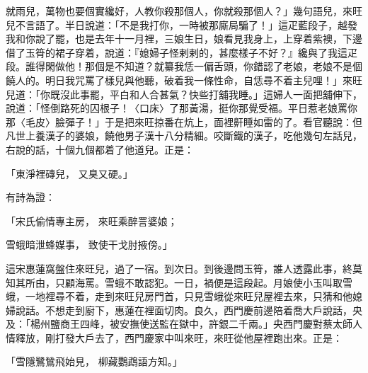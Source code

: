 \begin{showcontents}{}
就雨兒，萬物也要個實纔好，人教你殺那個人，你就殺那個人？」幾句語兒，來旺兒不言語了。半日說道：「不是我打你，一時被那廝局騙了！」這疋藍段子，越發我和你說了罷，也是去年十一月裡，三娘生日，娘看見我身上，上穿着紫襖，下邊借了玉筲的裙子穿着，說道：『媳婦子怪剌剌的，甚麼樣子不好？』纔與了我這疋段。誰得閑做他！那個是不知道？就纂我恁一偏舌頭，你錯認了老娘，老娘不是個饒人的。明日我咒罵了樣兒與他聽，破着我一條性命，自恁尋不着主兒哩！」來旺兒道：「你既沒此事罷，平白和人合甚氣？快些打舖我睡。」這婦人一面把舖伸下，說道：「怪倒路死的囚根子！〈口床〉了那黃湯，挺你那覺受福。平日惹老娘罵你那〈毛皮〉臉彈子！」于是把來旺掠番在炕上，面裡鼾睡如雷的了。看官聽說：但凡世上養漢子的婆娘，饒他男子漢十八分精細。咬斷鐵的漢子，吃他幾句左話兒，右說的話，十個九個都着了他道兒。正是：

「東淨裡磚兒，  又臭又硬。」

有詩為證：

「宋氏偷情專主房，  來旺乘醉詈婆娘；

雪蛾暗泄蜂媒事，  致使干戈肘掖傍。」

這宋惠蓮窩盤住來旺兒，過了一宿。到次日。到後邊問玉筲，誰人透露此事，終莫知其所由，只顧海罵。雪蛾不敢認犯。一日，禍便是這段起。月娘使小玉叫取雪蛾，一地裡尋不着，走到來旺兒房門首，只見雪蛾從來旺兒屋裡去來，只猜和他媳婦說話。不想走到廚下，惠蓮在裡面切肉。良久，西門慶前邊陪着喬大戶說話，央及：「楊州鹽商王四峰，被安撫使送監在獄中，許銀二千兩。」央西門慶對蔡太師人情釋放，剛打發大戶去了，西門慶家中叫來旺，來旺從他屋裡跑出來。正是：

「雪隱鷺鷥飛始見，  柳藏鸚鵡語方知。」


\end{showcontents}
